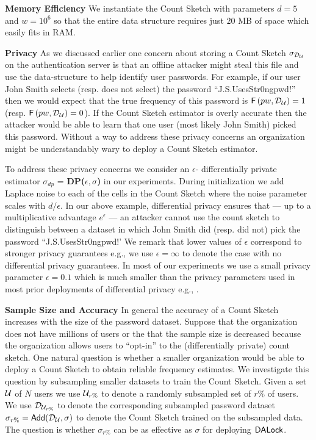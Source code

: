 \textbf{Memory Efficiency} We instantiate the Count Sketch with parameters $d=5$ and $w=10^6$ so that the entire data structure requires just $20$ MB of space which easily fits in RAM. 


\textbf{Privacy} As we discussed earlier one concern about storing a Count Sketch $\sigma_{\mathcal{D}_{{\mathcal{U}}}} $ on the authentication server is that an offline attacker might steal this file and use the data-structure to help identify user passwords. For example, if our user John Smith selects (resp. does not select) the password ``J.S.UsesStr0ngpwd!'' then we would expect that the true frequency of this password is $\mathsf{F}\left(pw, \mathcal{D}_{{\mathcal{U}}} \right)=1$ (resp. $\mathsf{F}\left(pw, \mathcal{D}_{{\mathcal{U}}} \right)=0$). If the Count Sketch estimator is overly accurate then the attacker would be able to learn that one user (most likely John Smith) picked this password. Without a way to address these privacy concerns an organization might be understandably wary to deploy a Count Sketch estimator.


To address these privacy concerns we consider an $\epsilon$- differentially private estimator $\sigma_{dp}$ = \textbf{DP($\epsilon,\sigma$)} in our experiments. During initialization we add Laplace noise to each of the cells in the Count Sketch where the noise parameter scales with $d/\epsilon$. In our above example, differential privacy ensures that --- up to a multiplicative advantage $e^{\epsilon}$ --- an attacker cannot use the count sketch to distinguish between a dataset in which John Smith did (resp. did not) pick the password ``J.S.UsesStr0ngpwd!' We remark that lower values of $\epsilon$ correspond to stronger privacy guarantees e.g., we use $\epsilon=\infty$ to denote the case with no differential privacy guarantees. In most of our experiments we use a small privacy parameter $\epsilon=0.1$ which is much smaller than the privacy parameters used in most prior deployments of differential privacy e.g.,  \cite{NDSS:BloDatBon16,AppleDPTeam,CCS:ErlPihKor14}. 


\textbf{Sample Size and Accuracy} In general the accuracy of a Count Sketch increases with the size of the password dataset. Suppose that the organization does not have millions of users or the that the sample size is decreased because the organization allows users to ``opt-in'' to the (differentially private) count sketch. One natural question is whether a smaller organization would be able to deploy a Count Sketch to obtain reliable frequency estimates. We investigate this question by subsampling smaller datasets to train the Count Sketch. Given a set $\mathcal{U}$ of $N$ users we use $\mathcal{U}_{r\%}$ to denote a randomly subsampled set of $r\%$ of users. We use $\mathcal{D}_{{\mathcal{U}_{r\%}}}$ to denote the corresponding subsampled password dataset $\sigma_{r\%} = \mathsf{Add}(\mathcal{D}_{{\mathcal{U}}},\sigma) $ to denote the Count Sketch trained on the subsampled data. The question is whether $\sigma_{r\%}$ can be as effective as $\sigma$ for deploying $\mathsf{DALock}$. 


